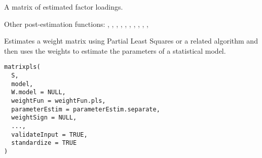 \documentclass[a4paper]{book}
\begin{document}
%
\begin{Value}
A matrix of estimated factor loadings.
\end{Value}
%
\begin{SeeAlso}\relax
Other post-estimation functions: 
,
,
,
,
,
,
,
,
,
,
\end{SeeAlso}
%
\begin{Description}\relax
Estimates a weight matrix using Partial Least Squares or a related algorithm and then
uses the weights to estimate the parameters of a statistical model.
\end{Description}
%
\begin{Usage}
\begin{verbatim}
matrixpls(
  S,
  model,
  W.model = NULL,
  weightFun = weightFun.pls,
  parameterEstim = parameterEstim.separate,
  weightSign = NULL,
  ...,
  validateInput = TRUE,
  standardize = TRUE
)
\end{verbatim}
\end{Usage}
%
\end{document}
